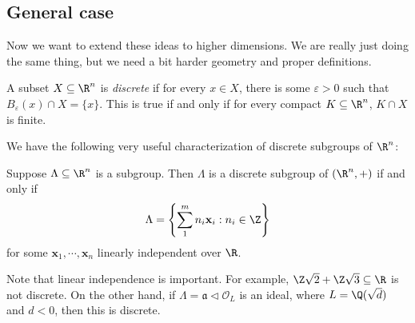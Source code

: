 \documentclass[a4paper]{article}
\begin{document}
\subsection*{General case}
Now we want to extend these ideas to higher dimensions. We are really just doing the same thing, but we need a bit harder geometry and proper definitions.

\begin{defi}
  A subset $X \subseteq \R^n$ is \emph{discrete} if for every $x \in X$, there is some $\varepsilon > 0$ such that $B_\varepsilon(x) \cap X = \{x\}$. This is true if and only if for every compact $K \subseteq \R^n$, $K\cap X$ is finite.
\end{defi}

We have the following very useful characterization of discrete subgroups of $\R^n$:
\begin{prop}
  Suppose $\Lambda \subseteq \R^n$ is a subgroup. Then $\Lambda$ is a discrete subgroup of $(\R^n, +)$ if and only if
  \[
    \Lambda = \left\{\sum_1^m n_i \mathbf{x}_i : n_i \in \Z\right\}
  \]
  for some $\mathbf{x}_1, \cdots, \mathbf{x}_n$ linearly independent over $\R$.
\end{prop}

Note that linear independence is important. For example, $\Z \sqrt{2} + \Z \sqrt{3} \subseteq \R$ is not discrete. On the other hand, if $\Lambda = \mathfrak{a} \lhd \mathcal{O}_L$ is an ideal, where $L = \Q(\sqrt{d})$ and $d < 0$, then this is discrete.
\end{document}
